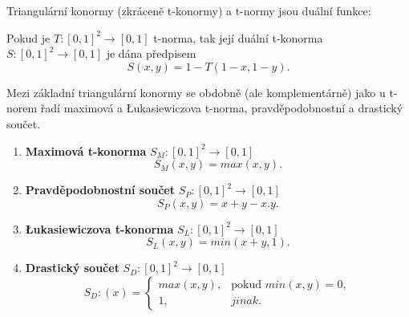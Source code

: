 Triangulární konormy (zkráceně t-konormy) a t-normy jsou du\'aln\'i funkce:

\begin{sentence}
    \cite{Springer}
    Pokud je $T:[0,1]^2\to [0,1]$ t-norma, tak její duální t-konorma $S: [0,1]^2 \rightarrow [0,1]$ je dána předpisem $$S(x,y) = 1 - T(1-x, 1-y).$$
\end{sentence}


Mezi základní triangulární konormy se obdobně (ale komplementárně) jako u t-norem řadí maximová a Łukasiewiczova t-norma, pravděpodobnostní a drastický součet.
\begin{example}
\cite{Springer}
    \begin{enumerate}
    \item \textbf{Maximová t-konorma} $S_M: [0,1]^2 \rightarrow [0,1]$
    $$S_M(x,y) = max(x,y).$$
    \item \textbf{Pravděpodobnostní součet} $S_P: [0,1]^2 \rightarrow [0,1]$
    $$S_P(x,y) = x+y-x.y.$$
    \item \textbf{Łukasiewiczova t-konorma} $S_L: [0,1]^2 \rightarrow [0,1]$
    $$S_L(x,y) = min(x+y,1).$$
    \item \textbf{Drastický součet} $S_D: [0,1]^2 \rightarrow [0,1]$
    $$S_D:(x)=\begin{cases} max(x,y), & \mbox{pokud  }  min(x,y) = 0,\\ 
    1, &  jinak.  \end{cases}$$
\end{enumerate}
\end{example}

